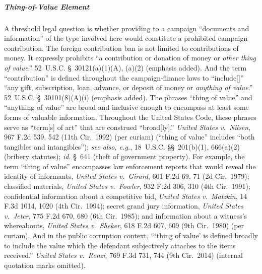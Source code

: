 \subparagraph{Thing-of-Value Element}
A threshold legal question is whether providing to a campaign ``documents and information'' of the type involved here would constitute a prohibited campaign contribution.
The foreign contribution ban is not limited to contributions of money.
It expressly prohibits ``a contribution or donation of money or \textit{other thing of value}.''
52~U.S.C. \S~30121(a)(1)(A), (a)(2) (emphasis added).
And the term ``contribution'' is defined throughout the campaign-finance laws to ``include[]'' ``any gift, subscription, loan, advance, or deposit of money or \textit{anything of value}.''
52~U.S.C. \S~30101(8)(A)(i) (emphasis added).
The phrases ``thing of value'' and ``anything of value'' are broad and inclusive enough to encompass at least some forms of valuable information.
Throughout the United States Code, these phrases serve as ``term[s] of art'' that are construed ``broad[ly].''
\textit{United States v.\ Nilsen}, 967 F.2d 539, 542 (11th Cir.~1992) (per curiam) (``thing of value'' includes ``both tangibles and intangibles''); \textit{see also, e.g.}, 18~U.S.C. \S\S~201(b)(1), 666(a)(2) (bribery statutes); \textit{id.} \S~641 (theft of government property).
For example, the term ``thing of value'' encompasses law enforcement reports that would reveal the identity of informants, \textit{United States v.\ Girard}, 601 F.2d 69, 71 (2d Cir.~1979); classified materials, \textit{United States v.\ Fowler}, 932 F.2d 306, 310 (4th Cir.~1991); confidential information about a competitive bid, \textit{United States v.\ Matzkin}, 14 F.3d 1014, 1020 (4th Cir.~1994); secret grand jury information, \textit{United States v.\ Jeter}, 775 F.2d 670, 680 (6th Cir.~1985); and information about a witness's whereabouts, \textit{United States v.\ Sheker}, 618 F.2d 607, 609 (9th Cir.~1980) (per curiam).
And in the public corruption context, ``\thinspace`thing of value' is defined broadly to include the value which the defendant subjectively attaches to the items received.''
\textit{United States v.\ Renzi}, 769 F.3d 731, 744 (9th Cir.~2014) (internal quotation marks omitted).

